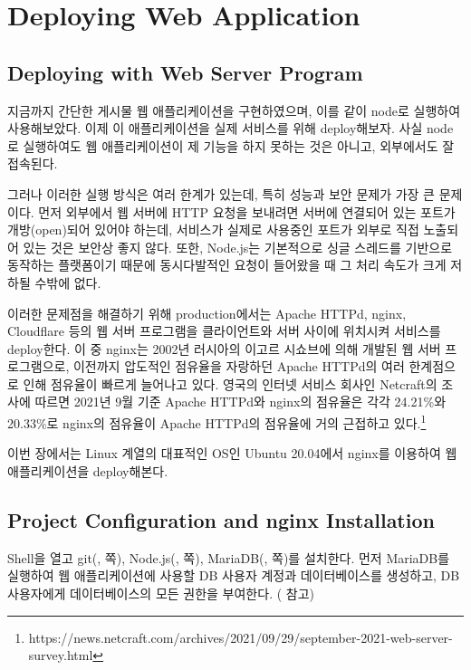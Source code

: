 \section{Deploying Web Application}\label{sect:web-app-deploy}

\subsection*{Deploying with Web Server Program}

지금까지 간단한 게시물 웹 애플리케이션을 구현하였으며, 이를 \와 같이 node로 실행하여 사용해보았다. 이제 이 애플리케이션을 실제 서비스를 위해 deploy해보자. 사실 node로 실행하여도 웹 애플리케이션이 제 기능을 하지 못하는 것은 아니고, 외부에서도 잘 접속된다.

그러나 이러한 실행 방식은 여러 한계가 있는데, 특히 성능과 보안 문제가 가장 큰 문제이다. 먼저 외부에서 웹 서버에 HTTP 요청을 보내려면 서버에 연결되어 있는 포트가 개방(open)되어 있어야 하는데, 서비스가 실제로 사용중인 포트가 외부로 직접 노출되어 있는 것은 보안상 좋지 않다. 또한, Node.js는 기본적으로 싱글 스레드를 기반으로 동작하는 플랫폼이기 때문에 동시다발적인 요청이 들어왔을 때 그 처리 속도가 크게 저하될 수밖에 없다.

이러한 문제점을 해결하기 위해 production에서는 Apache HTTPd, nginx, Cloudflare 등의 웹 서버 프로그램을 클라이언트와 서버 사이에 위치시켜 서비스를 deploy한다. 이 중 nginx는 2002년 러시아의 이고르 시쇼브에 의해 개발된 웹 서버 프로그램으로, 이전까지 압도적인 점유율을 자랑하던 Apache HTTPd의 여러 한계점으로 인해 점유율이 빠르게 늘어나고 있다. 영국의 인터넷 서비스 회사인 Netcraft의 조사에 따르면 2021년 9월 기준 Apache HTTPd와 nginx의 점유율은 각각 24.21\%와 20.33\%로 nginx의 점유율이 Apache HTTPd의 점유율에 거의 근접하고 있다.\footnote{https://news.netcraft.com/archives/2021/09/29/september-2021-web-server-survey.html}

이번 장에서는 Linux 계열의 대표적인 OS인 Ubuntu 20.04에서 nginx를 이용하여 웹 애플리케이션을 deploy해본다.

\subsection*{Project Configuration and nginx Installation}

Shell을 열고 git(, \pageref{shell:git-install-ubuntu}쪽), Node.js(, \pageref{shell:nodejs-linux-install}쪽), MariaDB(, \pageref{shell:mariadb-installation-ubuntu}쪽)를 설치한다. 먼저 MariaDB를 실행하여 웹 애플리케이션에 사용할 DB 사용자 계정과 데이터베이스를 생성하고, DB 사용자에게 데이터베이스의 모든 권한을 부여한다. ( 참고)

